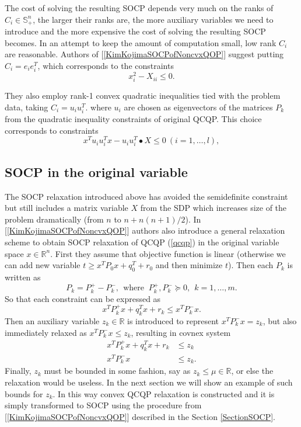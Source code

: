 \documentclass[12pt]{book}
\theoremstyle{definition}
\begin{document}
The cost of solving the resulting SOCP depends very much on the ranks of $C_i \in \mathbb{S}^n_+$, 
the larger their ranks are, the more auxiliary variables we need to 
introduce and the more expensive the cost of solving the resulting SOCP becomes. In an
attempt to keep the amount of computation small, low rank $C_i$ are
reasonable. Authors of [\ref{KimKojimaSOCPofNoncvxQOP}] suggest putting $C_i = e_ie_i^T$, which corresponds to the constraints
\begin{equation}
x_i^2 - X_{ii} \leq 0.
\end{equation}

They also employ rank-1 convex quadratic inequalities tied with the problem data, taking $C_i = u_iu^T_i$. 
where $u_i$ are chosen as eigenvectors of the matrices $P_k$ from the quadratic inequality constraints of original QCQP. This choice corresponds to constraints
\begin{equation}
x^Tu_iu_i^Tx - u_iu_i^T\bullet X \leq 0 \ (i = 1,\dots ,l),
\end{equation}
 	


\subsection{SOCP in the original variable}

The SOCP relaxation introduced above has avoided the semidefinite constraint but still includes a matrix variable $X$ from the SDP which increases size of the problem dramatically (from $n$ to $n+ n(n+1)/2$). In [\ref{KimKojimaSOCPofNoncvxQOP}] authors also introduce a general relaxation scheme to obtain SOCP relaxation of QCQP (\ref{qcqp}) in the original variable space $x\in \mathbb{R}^n$. First they assume that objective function is linear (otherwise we can add new variable $t\geq x^TP_0x + q_0^T + r_0$ and then minimize $t$). Then each $P_k$ is written as 
$$P_k=P_k^+ -P_k^-, \ \ \mbox{where } \ P_k^+, P_k^- \succeq 0, \ \ k=1,\dots ,m.$$ 
So that each constraint can be expressed as 
\begin{equation}
x^TP_k^+x + q_k^Tx + r_k \leq x^TP_k^-x.
\end{equation}
Then an auxiliary variable $z_k\in \mathbb{R}$ is introduced to represent $x^TP_k^-x = z_k$, but also immediately relaxed as $x^TP_k^-x \leq z_k$, resulting in covnex system
\begin{equation}
\begin{array}{rl}
x^TP_k^+x + q_k^Tx + r_k &\leq z_k  \\
x^TP_k^-x & \leq z_k.
\end{array} 
\end{equation}
Finally, $z_k$ must be bounded in some fashion, say as $z_k\leq \mu \in \mathbb{R}$, or else the relaxation would be useless. In the next section we will show an example of such bounds for $z_k$.
In this way convex QCQP relaxation is constructed and it is simply transformed to SOCP using the procedure from [\ref{KimKojimaSOCPofNoncvxQOP}] described in the Section \ref{SectionSOCP}. 
\end{document}
